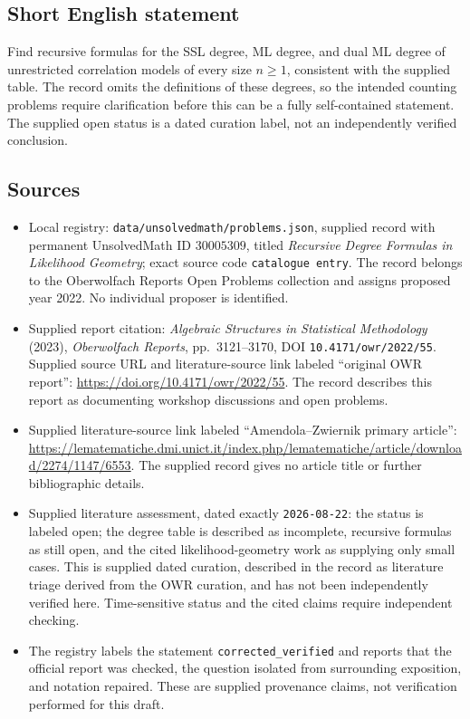 \documentclass[11pt]{article}
\begin{document}
\subsection{Short English statement}
Find recursive formulas for the SSL degree, ML degree, and dual ML degree of unrestricted correlation models of every size \(n\geq1\), consistent with the supplied table. The record omits the definitions of these degrees, so the intended counting problems require clarification before this can be a fully self-contained statement. The supplied open status is a dated curation label, not an independently verified conclusion.
\subsection{Sources}
\begin{itemize}
\item Local registry: \texttt{data/unsolvedmath/problems.json}, supplied record with permanent UnsolvedMath ID \(30005309\), titled \emph{Recursive Degree Formulas in Likelihood Geometry}; exact source code \texttt{catalogue entry}. The record belongs to the Oberwolfach Reports Open Problems collection and assigns proposed year 2022. No individual proposer is identified.
\item Supplied report citation: \emph{Algebraic Structures in Statistical Methodology} (2023), \emph{Oberwolfach Reports}, pp.~3121--3170, DOI \texttt{10.4171/owr/2022/55}. Supplied source URL and literature-source link labeled ``original OWR report'': \url{https://doi.org/10.4171/owr/2022/55}. The record describes this report as documenting workshop discussions and open problems.
\item Supplied literature-source link labeled ``Amendola--Zwiernik primary article'': \url{https://lematematiche.dmi.unict.it/index.php/lematematiche/article/download/2274/1147/6553}. The supplied record gives no article title or further bibliographic details.
\item Supplied literature assessment, dated exactly \texttt{2026-08-22}: the status is labeled open; the degree table is described as incomplete, recursive formulas as still open, and the cited likelihood-geometry work as supplying only small cases. This is supplied dated curation, described in the record as literature triage derived from the OWR curation, and has not been independently verified here. Time-sensitive status and the cited claims require independent checking.
\item The registry labels the statement \texttt{corrected\_verified} and reports that the official report was checked, the question isolated from surrounding exposition, and notation repaired. These are supplied provenance claims, not verification performed for this draft.
\end{itemize}
\end{document}
